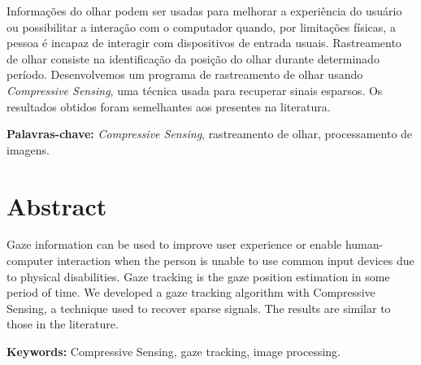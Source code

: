 \documentclass[12pt]{report}
\begin{document}
Informações do olhar podem ser usadas para melhorar a experiência do usuário ou possibilitar a interação com o computador quando, por limitações físicas, a pessoa é incapaz de interagir com dispositivos de entrada usuais. Rastreamento de olhar consiste na identificação da posição do olhar durante determinado período. Desenvolvemos um programa de rastreamento de olhar usando \textit{Compressive Sensing}, uma técnica usada para recuperar sinais esparsos. Os resultados obtidos foram semelhantes aos presentes na literatura.

\noindent \textbf{Palavras-chave:} \textit{Compressive Sensing}, rastreamento de olhar, processamento de imagens.



\chapter*{Abstract}

Gaze information can be used to improve user experience or enable human-computer interaction when the person is unable to use common input devices due to physical disabilities. Gaze tracking is the gaze position estimation in some period of time.  We developed a gaze tracking algorithm with Compressive Sensing, a technique used to recover sparse signals. The results are similar to those in the literature.

\noindent \textbf{Keywords:} Compressive Sensing, gaze tracking, image processing.

\tableofcontents    %









\appendix



\end{document}
